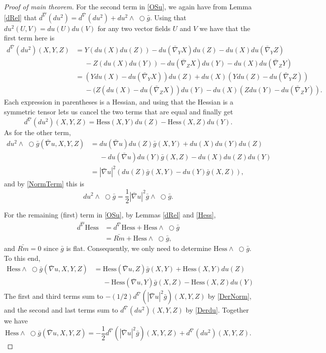 \documentclass{amsart}
\newcommand{\wtimes}{\wedge \!\!\!\!\!\!\!\!\;\bigcirc}
\begin{document}
\begin{proof}[Proof of main theorem]
For the second term in \eqref{OSu}, we again have from Lemma \ref{dRel} that $d^{\hat{\nabla}}(du^2) = d^{\bar{\nabla}}(du^2) + du^2\wtimes \bar{g}$.
Using that $du^2(U,V) = du(U)du(V)$ for any two vector fields $U$ and $V$ we have that the first term here is 
\begin{align*}
d^{\bar{\nabla}}(du^2)(X,Y,Z)
&= Y(du(X)du(Z)) - du(\bar{\nabla}_YX)du(Z) - du(X)du(\bar{\nabla}_YZ) \\
&\phantom{=} - Z(du(X)du(Y)) - du(\bar{\nabla}_ZX)du(Y) - du(X)du(\bar{\nabla}_ZY) \\[2mm]
&= (Ydu(X) - du(\bar{\nabla}_YX))du(Z) + du(X)(Ydu(Z)-du(\bar{\nabla}_YZ)) \\
&\phantom{=} - (Z(du(X) - du(\bar{\nabla}_ZX))du(Y) - du(X)(Zdu(Y)-du(\bar{\nabla}_ZY)).
\end{align*}
Each expression in parentheses is a Hessian, and using that the Hessian is a symmetric tensor lets us cancel the two terms that are equal and finally get 
\begin{equation}
\label{Derdu}
d^{\bar{\nabla}}(du^2)(X,Y,Z) = \mathrm{Hess}(X,Y)du(Z) - \mathrm{Hess}(X,Z)du(Y).
\end{equation}
As for the other term, 
\begin{align*}
du^2\wtimes \bar{g}(\bar{\nabla}u,X,Y,Z)
&= du(\bar{\nabla}u)du(Z)\bar{g}(X,Y) + du(X)du(Y)du(Z) \\
&\phantom{=} - du(\bar{\nabla}u)du(Y)\bar{g}(X,Z) - du(X)du(Z)du(Y) \\[2mm]
&= |\bar{\nabla}u|^2(du(Z)\bar{g}(X,Y) - du(Y)\bar{g}(X,Z)),
\end{align*}
and by \eqref{NormTerm} this is 
\begin{equation}
du^2\wtimes\bar{g} = \frac{1}{2}|\bar{\nabla}u|^2\bar{g}\wtimes\bar{g}.
\end{equation}

For the remaining (first) term in \eqref{OSu}, by Lemmas \ref{dRel} and \ref{Hess}, 
\begin{align*}
d^{\hat{\nabla}}\mathrm{Hess} 
&= d^{\bar{\nabla}}\mathrm{Hess} + \mathrm{Hess}\wtimes \bar{g} \\
&= \bar{Rm} + \mathrm{Hess}\wtimes \bar{g},
\end{align*}
and $\bar{Rm} = 0$ since $\bar{g}$ is flat. 
Consequently, we only need to determine $\mathrm{Hess}\wtimes \bar{g}$. 
To this end, 
\begin{align*}
\mathrm{Hess}\wtimes \bar{g}(\bar{\nabla}u,X,Y,Z)
&= \mathrm{Hess}(\bar{\nabla}u,Z)\bar{g}(X,Y) + \mathrm{Hess}(X,Y)du(Z) \\
&\phantom{=} -\mathrm{Hess}(\bar{\nabla}u,Y)\bar{g}(X,Z) - \mathrm{Hess}(X,Z)du(Y)
\end{align*}
The first and third terms sum to $-(1/2)d^{\bar{\nabla}}(|\bar{\nabla}u|^2\bar{g})(X,Y,Z)$ by \eqref{DerNorm}, and the second and last terms sum to $d^{\bar{\nabla}}(du^2)(X,Y,Z)$ by \eqref{Derdu}.
Together we have 
\begin{equation}
\label{HessProd}
\mathrm{Hess}\wtimes \bar{g}(\bar{\nabla}u,X,Y,Z) = -\frac{1}{2}d^{\bar{\nabla}}(|\bar{\nabla}u|^2\bar{g})(X,Y,Z) + d^{\bar{\nabla}}(du^2)(X,Y,Z).
\end{equation}


\end{proof}
\end{document}
